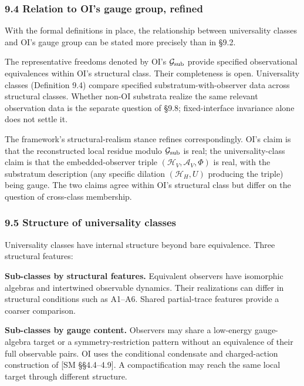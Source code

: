 \documentclass[
]{article}
\begin{document}
\hypertarget{relation-to-ois-gauge-group-refined}{%
\subsubsection{9.4 Relation to OI's gauge group,
refined}\label{relation-to-ois-gauge-group-refined}}

With the formal definitions in place, the relationship between
universality classes and OI's gauge group can be stated more precisely
than in §9.2.

The representative freedoms denoted by OI's \(\mathcal G_{\rm sub}\)
provide specified observational equivalences within OI's structural
class. Their completeness is open. Universality classes (Definition 9.4)
compare specified substratum-with-observer data across structural
classes. Whether non-OI substrata realize the same relevant observation
data is the separate question of §9.8; fixed-interface invariance alone
does not settle it.

The framework's structural-realism stance refines correspondingly. OI's
claim is that the reconstructed local residue modulo
\(\mathcal{G}_{\rm sub}\) is real; the universality-class claim is that
the embedded-observer triple \((\mathcal{H}_V, \mathcal{A}_V, \Phi)\) is
real, with the substratum description (any specific dilation
\((\mathcal{H}_H, U)\) producing the triple) being gauge. The two claims
agree within OI's structural class but differ on the question of
cross-class membership.

\hypertarget{structure-of-universality-classes}{%
\subsubsection{9.5 Structure of universality
classes}\label{structure-of-universality-classes}}

Universality classes have internal structure beyond bare equivalence.
Three structural features:

\textbf{Sub-classes by structural features.} Equivalent observers have
isomorphic algebras and intertwined observable dynamics. Their
realizations can differ in structural conditions such as A1--A6. Shared
partial-trace features provide a coarser comparison.

\textbf{Sub-classes by gauge content.} Observers may share a low-energy
gauge-algebra target or a symmetry-restriction pattern without an
equivalence of their full observable pairs. OI uses the conditional
condensate and charged-action construction of {[}SM §§4.4--4.9{]}. A
compactification may reach the same local target through different
structure.
\end{document}
